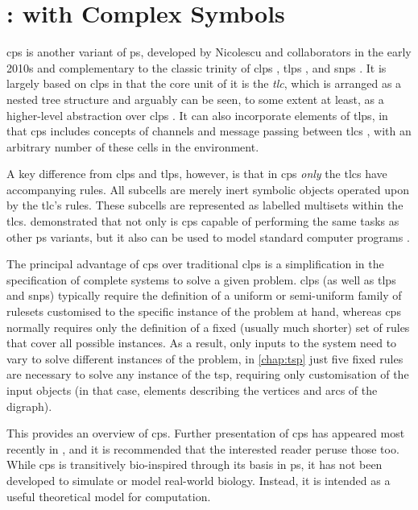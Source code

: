 \chapter{\label{chap:cpsystems}:  with Complex Symbols}

\gls{cps} is another variant of \gls{ps}, developed by Nicolescu and collaborators in the early 2010s \fxerror[inline]{[ref]} and complementary to the classic trinity of \gls{clps} \cite{Paun2000}, \gls{tlps} \cite{Martin-Vide2003}, and \gls{snps} \cite{Ionescu2006}.  It is largely based on \gls{clps} in that the core unit of it is the \emph{\gls{tlc}}, which is arranged as a nested tree structure and arguably can be seen, to some extent at least, as a higher-level abstraction over \gls{clps} \cite{Nicolescu2018}.  It can also incorporate elements of \gls{tlps}, in that \gls{cps} includes concepts of channels and message passing between \glspl{tlc} \cite{Henderson2019}, with an arbitrary number of these cells in the environment.  

A key difference from \gls{clps} and \gls{tlps}, however, is that in \gls{cps} \emph{only} the \glspl{tlc} have accompanying rules.  All subcells are merely inert symbolic objects operated upon by the \gls{tlc}'s rules.  These subcells are represented as labelled multisets within the \glspl{tlc}.  \citeauthor{Nicolescu2014a} demonstrated that not only is \gls{cps} capable of performing the same tasks as other \gls{ps} variants, but it also can be used to model standard computer programs \cite{Nicolescu2014a}.

The principal advantage of \gls{cps} over traditional \gls{clps} is a simplification in the specification of complete systems to solve a given problem.  \Gls{clps} (as well as \gls{tlps} and \gls{snps}) typically require the definition of a uniform or semi-uniform family of \glspl{ruleset} customised to the specific instance of the problem at hand, whereas \gls{cps} normally requires only the definition of a fixed (usually much shorter) set of rules that cover all possible instances. As a result, only inputs to the system need to vary to solve different instances of the problem, \eg{} in \cref{chap:tsp} just five fixed rules are necessary to solve any instance of the \gls{tsp}, requiring only customisation of the input objects (in that case, elements describing the vertices and arcs of the digraph).

This  provides an overview of \gls{cps}.  Further presentation of \gls{cps} has appeared most recently in \cite{Nicolescu2018,Henderson2019,Henderson2020,Liu2020,Liu2021}, and it is recommended that the interested reader peruse those too.  While \gls{cps} is transitively bio-inspired through its basis in \gls{ps}, it has not been developed to simulate or model real-world biology.  Instead, it is intended as a useful theoretical model for computation.

